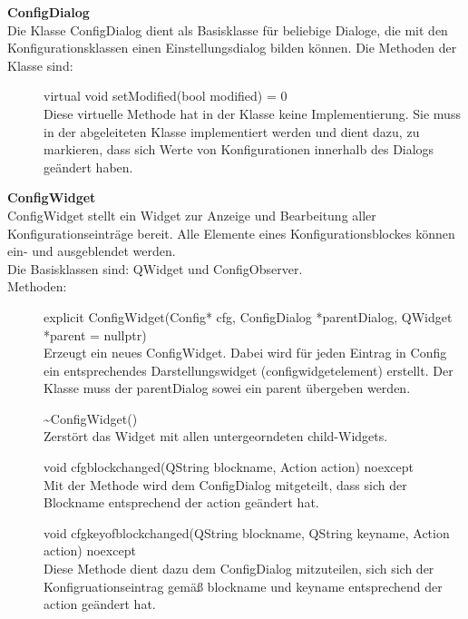 \textbf{ConfigDialog}\\
Die Klasse ConfigDialog dient als Basisklasse für beliebige Dialoge, die mit den Konfigurationsklassen einen Einstellungsdialog bilden können. Die Methoden der Klasse sind:
\begin{description}
	\item[ ] virtual void setModified(bool modified) = 0\\
	Diese virtuelle Methode hat in der Klasse keine Implementierung. Sie muss in der abgeleiteten Klasse implementiert werden und dient dazu, zu markieren, dass sich Werte von Konfigurationen innerhalb des Dialogs geändert haben.
\end{description}

\textbf{ConfigWidget}\\
ConfigWidget stellt ein Widget zur Anzeige und Bearbeitung aller Konfigurationseinträge bereit. Alle Elemente eines Konfigurationsblockes können ein- und ausgeblendet werden.\\
Die Basisklassen sind: QWidget und ConfigObserver.\\
Methoden:
\begin{description}
	\item[ ] explicit ConfigWidget(Config* cfg, ConfigDialog *parentDialog, QWidget *parent = nullptr)\\
	Erzeugt ein neues ConfigWidget. Dabei wird für jeden Eintrag in Config ein entsprechendes Darstellungswidget (configwidgetelement) erstellt. Der Klasse muss der parentDialog sowei ein parent übergeben werden.
  \item[ ] \~{}ConfigWidget()\\
		Zerstört das Widget mit allen untergeorndeten child-Widgets.
  \item[ ] void cfgblockchanged(QString blockname, Action action) noexcept\\
		Mit der Methode wird dem ConfigDialog mitgeteilt, dass sich der Blockname entsprechend der action geändert hat.
  \item[ ] void cfgkeyofblockchanged(QString blockname, QString keyname, Action action) noexcept\\
	Diese Methode dient dazu dem ConfigDialog mitzuteilen, sich sich der Konfigruationseintrag gemäß blockname und keyname entsprechend der action geändert hat.
\end{description}


